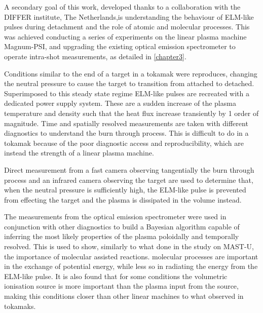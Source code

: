 A secondary goal of this work, developed thanks to a collaboration with the DIFFER institute, The Netherlands,is understanding the behaviour of ELM-like pulses during detachment and the role of atomic and molecular processes. This was achieved conducting a series of experiments on the linear plasma machine Magnum-PSI, and upgrading the existing optical emission spectrometer to operate intra-shot measurements, as detailed in \autoref{chapter3}.

Conditions similar to the end of a target in a tokamak were reproduces, changing the neutral pressure to cause the target to transition from attached to detached. Superimposed to this steady state regime ELM-like pulses are recreated with a dedicated power supply system. These are a sudden increase of the plasma temperature and density such that the heat flux increase transiently by 1 order of magnitude. Time and spatially resolved measurements are taken with different diagnostics to understand the burn through process. This is difficult to do in a tokamak because of the poor diagnostic access and reproducibility, which are instead the strength of a linear plasma machine.

Direct measurement from a fast camera observing tangentially the burn through process and an infrared camera observing the target are used to determine that, when the neutral pressure is sufficiently high, the ELM-like pulse is prevented from effecting the target and the plasma is dissipated in the volume instead.

The measurements from the optical emission spectrometer were used in conjunction with other diagnostics to build a Bayesian algorithm capable of inferring the most likely properties of the plasma poloidally and temporally resolved. This is used to show, similarly to what done in the study on MAST-U, the importance of molecular assisted reactions. molecular processes are important in the exchange of potential energy, while less so in radiating the energy from the ELM-like pulse. It is also found that for some conditions the volumetric ionisation source is more important than the plasma input from the source, making this conditions closer than other linear machines to what observed in tokamaks.


